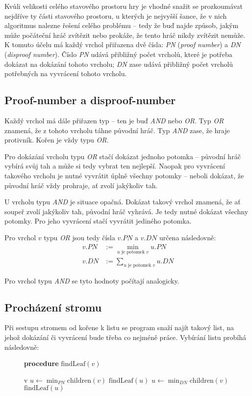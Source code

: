 \documentclass{article}
\begin{document}
Kvůli velikosti celého stavového prostoru hry je vhodné snažit se prozkoumávat nejdříve ty části stavového prostoru, u
kterých je nejvyšší šance, že v nich algoritmus nalezne řešení celého problému -- tedy že buď najde způsob, jakým může
počáteční hráč zvítězit nebo prokáže, že tento hráč nikdy zvítězit nemůže. K tomuto účelu má každý vrchol přiřazena dvě
čísla: \emph{PN} (\emph{proof number}) a \emph{DN} (\emph{disproof number}). Číslo \emph{PN} udává přibližný počet
vrcholů, které je potřeba dokázat na dokázání tohoto vrcholu; \emph{DN} zase udává přibližný počet vrcholů potřebných na
vyvrácení tohoto vrcholu.

\subsection{Proof-number a disproof-number}
Každý vrchol má dále přiřazen typ -- ten je buď \emph{AND} nebo \emph{OR}. Typ \emph{OR} znamená, že z tohoto vrcholu
táhne původní hráč. Typ \emph{AND} zase, že hraje protivník. Kořen je vždy typu \emph{OR}.

Pro dokázání vrcholu typu \emph{OR} stačí dokázat jednoho potomka -- původní hráč vybírá svůj tah a může si tedy vybrat
ten nejlepší. Naopak pro vyvrácení takového vrcholu je nutné vyvrátit úplně všechny potomky -- neboli dokázat, že
původní hráč vždy prohraje, ať zvolí jakýkoliv tah.

U vrcholu typu \emph{AND} je situace opačná. Dokázat takový vrchol znamená, že ať soupeř zvolí jakýkoliv tah, původní
hráč vyhrává. Je tedy nutné dokázat všechny potomky. Pro jeho vyvrácení stačí vyvrátit jediného potomka.

Pro vrchol $v$ typu \emph{OR} jsou tedy čísla $v.PN$ a $v.DN$ určena následovně:
\begin{align*}
	v.PN &:= \min_{u \text{ je potomek $v$}} u.PN \\
	v.DN &:= \sum_{u \text{ je potomek $v$}} u.DN
\end{align*}

Pro vrchol typu \emph{AND} se tyto hodnoty počítají analogicky.

\subsection{Procházení stromu}
Při sestupu stromem od kořene k listu se program snaží najít takový list, na jehož dokázání či vyvrácení bude třeba co
nejméně práce. Vybírání listu probíhá následovně:

\begin{figure}[H]
{\bf procedure} $\text{findLeaf}(v)$
\begin{algorithmic}
		 v
		\STATE $u \gets \min_{PN} \text{children}(v)$
		 $\text{findLeaf}(u)$
	\ELSE
		\STATE $u \gets \min_{DN} \text{children}(v)$
		 $\text{findLeaf}(u)$
	\ENDIF
\end{algorithmic}
\end{figure}
\end{document}
